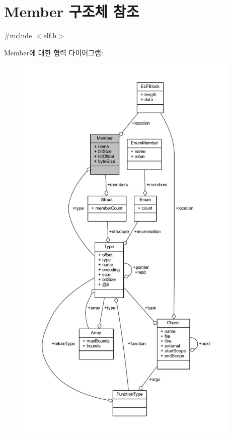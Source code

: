 \hypertarget{struct_member}{}\section{Member 구조체 참조}
\label{struct_member}


{\ttfamily \#include $<$elf.\+h$>$}



Member에 대한 협력 다이어그램\+:\nopagebreak
\begin{figure}[H]
\begin{center}
\leavevmode
\includegraphics[height=550pt]{struct_member__coll__graph}
\end{center}
\end{figure}
